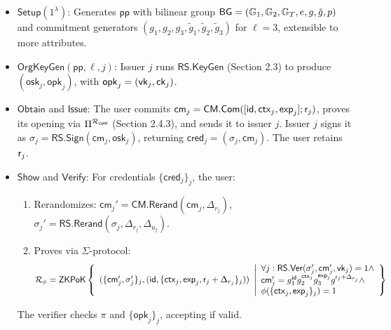 \begin{itemize}
    \item $\mathsf{Setup}(1^\lambda)$: Generates $\mathsf{pp}$ with bilinear group $\mathsf{BG} = (\mathbb{G}_1, \mathbb{G}_2, \mathbb{G}_T, e, g, \tilde{g}, p)$ and commitment generators $(g_1, g_2, g_3, \tilde{g}_1, \tilde{g}_2, \tilde{g}_3)$ for $\ell = 3$, extensible to more attributes.
    
    \item $\mathsf{OrgKeyGen}(\mathsf{pp}, \ell, j)$: Issuer $j$ runs $\mathsf{RS.KeyGen}$ (Section 2.3) to produce $(\mathsf{osk}_j, \mathsf{opk}_j)$, with $\mathsf{opk}_j = (\mathsf{vk}_j, \mathsf{ck}_j)$.

    \item $\mathsf{Obtain}$ and $\mathsf{Issue}$: The user commits $\mathsf{cm}_j = \mathsf{CM.Com}([\mathsf{id}, \mathsf{ctx}_j, \mathsf{exp}_j]; \mathsf{r}_j)$, proves its opening via $\Pi^{\mathcal{R}_{\mathsf{com}}}$ (Section 2.4.3), and sends it to issuer $j$. Issuer $j$ signs it as $\sigma_j = \mathsf{RS.Sign}(\mathsf{cm}_j, \mathsf{osk}_j)$, returning $\mathsf{cred}_j = (\sigma_j, \mathsf{cm}_j)$. The user retains $\mathsf{r}_j$.

    \item $\mathsf{Show}$ and $\mathsf{Verify}$: For credentials $\{\mathsf{cred}_j\}_j$, the user:
        \begin{enumerate}
            \item Rerandomizes: $\mathsf{cm}_j' = \mathsf{CM.Rerand}(\mathsf{cm}_j, \Delta_{r_j})$, $\sigma_j' = \mathsf{RS.Rerand}(\sigma_j, \Delta_{r_j}, \Delta_{u_j})$.
            \item Proves via $\Sigma$-protocol:
                \[
                \mathcal{R}_\phi = {\mathsf{ZKPoK}} \left\{ 
                \begin{array}{l} 
                (\{\mathsf{cm}_j', \sigma_j'\}_j, (\mathsf{id}, \{\mathsf{ctx}_j, \mathsf{exp}_j, \mathsf{r}_j + \Delta_{r_j}\}_j)) \\
                \end{array} 
                \middle|
                \begin{array}{l}
                \forall j: \mathsf{RS.Ver}(\sigma_j', \mathsf{cm}_j', \mathsf{vk}_j) = 1 \land \\
                \mathsf{cm}_j' = g_1^{\mathsf{id}} g_2^{\mathsf{ctx}_j} g_3^{\mathsf{exp}_j} g^{\mathsf{r}_j + \Delta_{r_j}} \land \\
                \phi(\{\mathsf{ctx}_j, \mathsf{exp}_j\}_j) = 1
                \end{array} 
                \right\}
                \]
        \end{enumerate}
        The verifier checks $\pi$ and $\{\mathsf{opk}_j\}_j$, accepting if valid.
\end{itemize}



